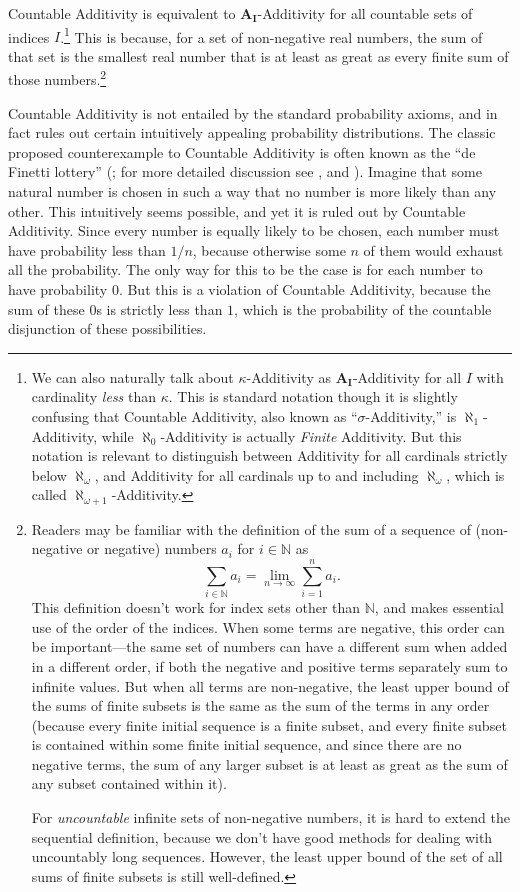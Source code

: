 Countable Additivity is equivalent to $\mathbf{A_I}$-Additivity for all countable sets of indices $I$.\footnote{We can also naturally talk about $\kappa$-Additivity as $\mathbf{A_I}$-Additivity for all $I$ with cardinality \emph{less} than $\kappa$. This is standard notation though it is slightly confusing that Countable Additivity, also known as ``$\sigma$-Additivity,'' is $\aleph_1$-Additivity, while $\aleph_0$-Additivity is actually \emph{Finite} Additivity. But this notation is relevant to distinguish between Additivity for all cardinals strictly below $\aleph_\omega$, and Additivity for all cardinals up to and including $\aleph_\omega$, which is called $\aleph_{\omega+1}$-Additivity.} This is because, for a set of non-negative real numbers, the sum of that set is the smallest real number that is at least as great as every finite sum of those numbers.\footnote{Readers may be familiar with the definition of the sum of a  sequence of (non-negative or negative) numbers $a_i$ for $i\in\mathbb{N}$ as
$$\sum_{i\in\mathbb{N}} a_i=\lim_{n\to\infty}\sum_{i=1}^n a_i.$$
This definition doesn't work for index sets other than $\mathbb{N}$, and makes essential use of the order of the indices. When some terms are negative, this order can be important---the same set of numbers can have a different sum when added in a different order, if both the negative and positive terms separately sum to infinite values. But when all terms are non-negative, the least upper bound of the sums of finite subsets is the same as the sum of the terms in any order (because every finite initial sequence is a finite subset, and every finite subset is contained within some finite initial sequence, and since there are no negative terms, the sum of any larger subset is at least as great as the sum of any subset contained within it).

For \emph{uncountable} infinite sets of non-negative numbers, it is hard to extend the sequential definition, because we don't have good methods for dealing with uncountably long sequences. However, the least upper bound of the set of all sums of finite subsets is still well-defined.}

Countable Additivity is not entailed by the standard probability axioms, and in fact rules out certain intuitively appealing probability distributions. The classic proposed counterexample to Countable Additivity is often known as the ``de Finetti lottery'' (\citealp{definetti}; for more detailed discussion see \citealp{countaddlottery}, and \citealp{howsoncountable}). Imagine that some natural number is chosen in such a way that no number is more likely than any other. This intuitively seems possible, and yet it is ruled out by Countable Additivity. Since every number is equally likely to be chosen, each number must have probability less than $1/n$, because otherwise some $n$ of them would exhaust all the probability. The only way for this to be the case is for each number to have probability $0$. But this is a violation of Countable Additivity, because the sum of these $0$s is strictly less than $1$, which is the probability of the countable disjunction of these possibilities.

